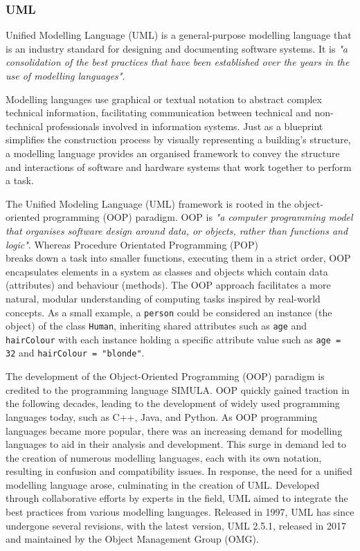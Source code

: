 \documentclass{article}
\begin{document}
{\subsubsection{UML}

Unified Modelling Language (UML) is a general-purpose modelling language that is an industry standard for designing and documenting software systems. It is \textit{"a consolidation of the best practices that have been established over the years in the use of modelling languages"}\cite{Seidl_Scholz_Huemer_Kappel_Duffy_2014}.

Modelling languages use graphical or textual notation to abstract complex technical information, facilitating communication between technical and non-technical professionals involved in information systems. Just as a blueprint simplifies the construction process by visually representing a building’s structure, a modelling language provides an organised framework to convey the structure and interactions of software and hardware systems that work together to perform a task\cite{Seidl_Scholz_Huemer_Kappel_Duffy_2014}.

The Unified Modeling Language (UML) framework is rooted in the object-oriented programming (OOP) paradigm. OOP is \textit{"a computer programming model that organises software design around data, or objects, rather than functions and logic"}\cite{TechTargetOOP}. Whereas Procedure Orientated Programming (POP)\\ breaks down a task into smaller functions, executing them in a strict order, OOP encapsulates elements in a system as classes and objects which contain data (attributes) and behaviour (methods)\cite{OOPPOP}. The OOP approach facilitates a more natural, modular understanding of computing tasks inspired by real-world concepts\cite{Seidl_Scholz_Huemer_Kappel_Duffy_2014}. As a small example, a \texttt{person} could be considered an instance (the object) of the class \texttt{Human}, inheriting shared attributes such as \texttt{age} and \texttt{hairColour} with each instance holding a specific attribute value such as \texttt{age = 32} and \texttt{hairColour = "blonde"}.

The development of the Object-Oriented Programming (OOP) paradigm is credited to the programming language SIMULA\cite{329756}. OOP quickly gained traction in the following decades, leading to the development of widely used programming languages today, such as C++, Java, and Python\cite{Seidl_Scholz_Huemer_Kappel_Duffy_2014}. As OOP programming languages became more popular, there was an increasing demand for modelling languages to aid in their analysis and development. This surge in demand led to the creation of numerous modelling languages, each with its own notation, resulting in confusion and compatibility issues\cite{Seidl_Scholz_Huemer_Kappel_Duffy_2014}. In response, the need for a unified modelling language arose, culminating in the creation of UML. Developed through collaborative efforts by experts in the field, UML aimed to integrate the best practices from various modelling languages\cite{Seidl_Scholz_Huemer_Kappel_Duffy_2014}. Released in 1997, UML has since undergone several revisions, with the latest version, UML 2.5.1, released in 2017 and maintained by the Object Management Group (OMG)\cite{OMG_UML}.

}
\end{document}

